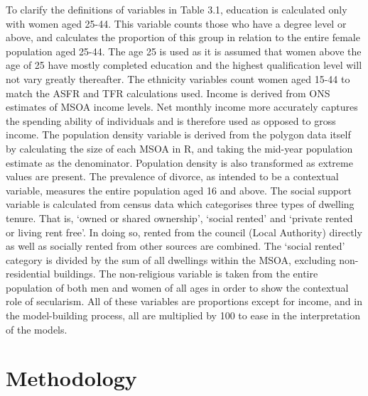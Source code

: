 \documentclass[12pt,twoside]{reedthesis}
\begin{document}
To clarify the definitions of variables in Table 3.1, education is calculated only with women aged 25-44. This variable counts those who have a degree level or above, and calculates the proportion of this group in relation to the entire female population aged 25-44. The age 25 is used as it is assumed that women above the age of 25 have mostly completed education and the highest qualification level will not vary greatly thereafter. The ethnicity variables count women aged 15-44 to match the ASFR and TFR calculations used. Income is derived from ONS estimates of MSOA income levels. Net monthly income more accurately captures the spending ability of individuals and is therefore used as opposed to gross income. The population density variable is derived from the polygon data itself by calculating the size of each MSOA in R, and taking the mid-year population estimate as the denominator. Population density is also transformed as extreme values are present. The prevalence of divorce, as intended to be a contextual variable, measures the entire population aged 16 and above. The social support variable is calculated from census data which categorises three types of dwelling tenure. That is, `owned or shared ownership', `social rented' and `private rented or living rent free'. In doing so, rented from the council (Local Authority) directly as well as socially rented from other sources are combined. The `social rented' category is divided by the sum of all dwellings within the MSOA, excluding non-residential buildings. The non-religious variable is taken from the entire population of both men and women of all ages in order to show the contextual role of secularism. All of these variables are proportions except for income, and in the model-building process, all are multiplied by 100 to ease in the interpretation of the models.

\hypertarget{Methodology}{%
\chapter{Methodology}\label{Methodology}}
\end{document}
